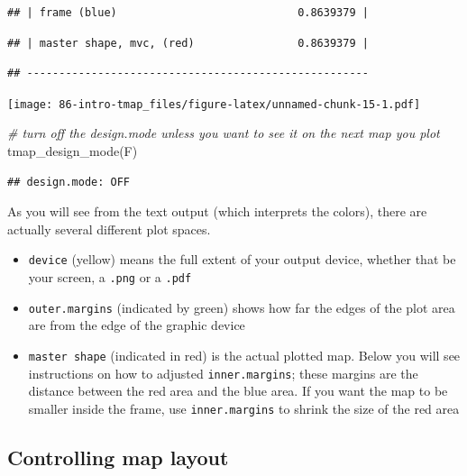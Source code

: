 \documentclass[
]{book}
\newenvironment{Shaded}{\begin{snugshade}}{\end{snugshade}}
\newcommand{\CommentTok}[1]{\textcolor[rgb]{0.56,0.35,0.01}{\textit{#1}}}
\newcommand{\FunctionTok}[1]{\textcolor[rgb]{0.00,0.00,0.00}{#1}}
\newcommand{\NormalTok}[1]{#1}
\providecommand{\tightlist}{%
  \setlength{\itemsep}{0pt}\setlength{\parskip}{0pt}}
\begin{document}
\begin{verbatim}
## | frame (blue)                            0.8639379 |
\end{verbatim}

\begin{verbatim}
## | master shape, mvc, (red)                0.8639379 |
\end{verbatim}

\begin{verbatim}
## -----------------------------------------------------
\end{verbatim}

\texttt{[image: 86-intro-tmap\_files/figure-latex/unnamed-chunk-15-1.pdf]}

\begin{Shaded}
\begin{Highlighting}[]
\CommentTok{\# turn off the design.mode unless you want to see it on the next map you plot}
\FunctionTok{tmap\_design\_mode}\NormalTok{(F)}
\end{Highlighting}
\end{Shaded}

\begin{verbatim}
## design.mode: OFF
\end{verbatim}

As you will see from the text output (which interprets the colors), there are actually several different plot spaces.

\begin{itemize}
\tightlist
\item
  \texttt{device} (yellow) means the full extent of your output device, whether that be your screen, a \texttt{.png} or a \texttt{.pdf}
\item
  \texttt{outer.margins} (indicated by green) shows how far the edges of the plot area are from the edge of the graphic device
\item
  \texttt{master\ shape} (indicated in red) is the actual plotted map. Below you will see instructions on how to adjusted \texttt{inner.margins}; these margins are the distance between the red area and the blue area. If you want the map to be smaller inside the frame, use \texttt{inner.margins} to shrink the size of the red area
\end{itemize}

\hypertarget{controlling-map-layout}{%
\subsection{Controlling map layout}\label{controlling-map-layout}}
\end{document}
